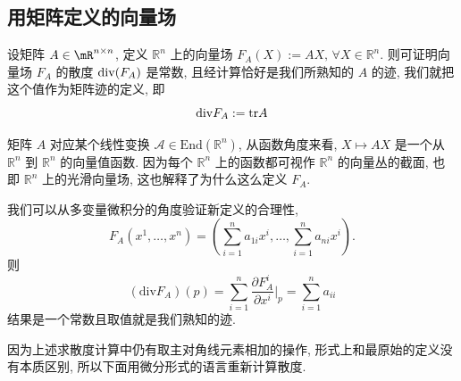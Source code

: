 \subsection{用矩阵定义的向量场}
    设矩阵  $A\in\mR^{n\times n}$, 定义 $\mathbb{R}^n$ 上的向量场 $F_A(X) := AX,\,\forall X\in\mathbb{R}^n$.
    则可证明向量场 $F_A$ 的散度 ${\rm div}(F_A)$ 是常数, 且经计算恰好是我们所熟知的 $A$ 的迹, 我们就把这个值作为矩阵迹的定义, 即
    \begin{equation*}
        {\rm div}F_A := {\rm tr}A
    \end{equation*}
    \begin{remark}
        矩阵 $A$ 对应某个线性变换 $\mathcal{A}\in\mathrm{End}(\mathbb{R}^n)$, 从函数角度来看,   $X\mapsto AX$ 是一个从 $\mathbb{R}^n$ 到 $\mathbb{R}^n$ 的向量值函数.
        因为每个 $\mathbb{R}^n$ 上的函数都可视作 $\mathbb{R}^n$ 的向量丛的截面, 也即 $\mathbb{R}^n$ 上的光滑向量场, 这也解释了为什么这么定义 $F_A$.
    \end{remark}
    \begin{remark}
        我们可以从多变量微积分的角度验证新定义的合理性,
        \begin{equation*}
            F_A(x^1,\dots,x^n) = (\sum_{i=1}^{n}a_{1i}x^i,\dots,\sum_{i=1}^{n}a_{ni}x^i).
        \end{equation*}
        则
        \begin{equation*}
            (\mathrm{div} F_A)(p) = \sum_{i=1}^{n}\frac{\partial F_A^i}{\partial x^i}\Bigg|_p = \sum_{i=1}^{n}a_{ii}
        \end{equation*}
        结果是一个常数且取值就是我们熟知的迹.
    \end{remark}
    因为上述求散度计算中仍有取主对角线元素相加的操作, 形式上和最原始的定义没有本质区别, 所以下面用微分形式的语言重新计算散度.

